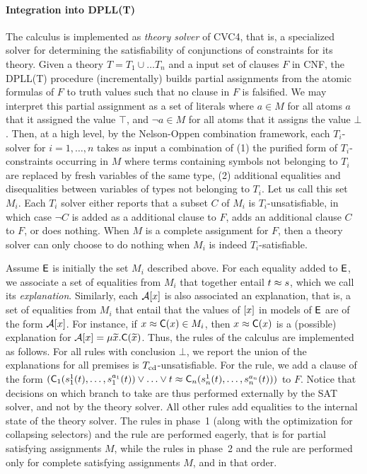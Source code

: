 \paragraph{Integration into DPLL(T)}
The calculus is implemented as \emph{theory solver} of CVC4,
that is, a specialized solver for determining the satisfiability of conjunctions of constraints for its theory.
Given a theory $T = T_1 \cup \ldots T_n$ and a input set of clauses $F$ in CNF,
the DPLL(T)  procedure
(incrementally) builds partial assignments from the atomic formulas of $F$ to truth values such that no clause in $F$ is falsified.
We may interpret this partial assignment as a set of literals where $a \in M$ for all atoms $a$ that it assigned the value $\top$, and $\neg a \in M$ for all atoms that it assigns the value $\bot$.
Then, at a high level, by the Nelson-Oppen combination framework,
each $T_i$-solver for $i = 1, \ldots, n$ takes as input a combination of (1) the purified form of $T_i$-constraints occurring in $M$ where terms containing symbols not belonging to $T_i$ are replaced by fresh variables of the same type,
(2) additional equalities and disequalities between variables of types not belonging to $T_i$.
Let us call this set $M_i$.
Each $T_i$ solver either
reports that a subset $C$ of $M_i$ is $T_i$-unsatisfiable, in which case $\neg C$ is added as a additional clause to $F$,
adds an additional clause $C$ to $F$,
or does nothing.
When $M$ is a complete assignment for $F$, then a theory solver can only choose to do nothing when $M_i$ is indeed $T_i$-satisfiable.

Assume $\mathsf{E}$ is initially the set $M_i$ described above.
For each equality added to $\mathsf{E}$, we associate a set of equalities from $M_i$ that together entail $t \approx s$,
which we call its \emph{explanation}.
Similarly, each $\mathcal{A} [x]$ is also associated an explanation, that is,
a set of equalities from $M_i$ that entail that the values of $[x]$ in models of $\mathsf{E}$ are of the form $\mathcal{A} [x]$.
For instance, if $x \approx \textsf{C}( x ) \in M_i$, then $x \approx \textsf{C}( x )$ is a (possible) explanation for $\mathcal{A} [x] = \mu {\widetilde{x}}. \textsf{C}( {\widetilde{x}} )$.
Thus, the rules of the calculus are implemented as follows.
For all rules with conclusion $\bot$,
we report the union of the explanations for all premises is $T_{\mathrm{cd}}$-unsatisfiable.
For the  rule, we add a clause of the form
$(\textsf{C}_1( s^1_1( t ), \ldots, s^{a_1}_1( t ) ) \vee \ldots \vee t \approx \textsf{C}_n( s^1_n( t ), \ldots, s^{a_n}_n( t ) ))$
to $F$.
Notice that decisions on which branch to take are thus performed externally by the SAT solver, and not by the theory solver.
All other rules add equalities to the internal state of the theory solver.
The rules in phase~1 (along with the optimization for collapsing selectors) and the  rule are performed eagerly,
that is for partial satisfying assignments $M$, while the rules in phase~2 and the  rule are performed only for complete satisfying assignments $M$,
and in that order.


